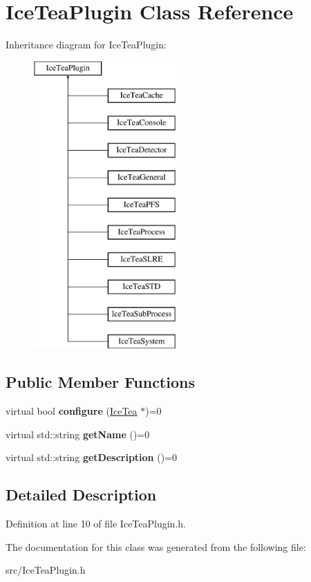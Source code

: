 \hypertarget{class_ice_tea_plugin}{}\section{Ice\+Tea\+Plugin Class Reference}
\label{class_ice_tea_plugin}
Inheritance diagram for Ice\+Tea\+Plugin\+:\begin{figure}[H]
\begin{center}
\leavevmode
\includegraphics[height=11.000000cm]{class_ice_tea_plugin}
\end{center}
\end{figure}
\subsection*{Public Member Functions}
\begin{DoxyCompactItemize}
\item 
virtual bool {\bfseries configure} (\hyperlink{class_ice_tea}{Ice\+Tea} $\ast$)=0\hypertarget{class_ice_tea_plugin_ae532ecb6f435a89f67be46fdd24b9b2a}{}\label{class_ice_tea_plugin_ae532ecb6f435a89f67be46fdd24b9b2a}

\item 
virtual std\+::string {\bfseries get\+Name} ()=0\hypertarget{class_ice_tea_plugin_acff80db4c0063ed72b3e0eba9325b439}{}\label{class_ice_tea_plugin_acff80db4c0063ed72b3e0eba9325b439}

\item 
virtual std\+::string {\bfseries get\+Description} ()=0\hypertarget{class_ice_tea_plugin_aaa6b8ed69a63a55d4412d526a36a0376}{}\label{class_ice_tea_plugin_aaa6b8ed69a63a55d4412d526a36a0376}

\end{DoxyCompactItemize}


\subsection{Detailed Description}


Definition at line 10 of file Ice\+Tea\+Plugin.\+h.



The documentation for this class was generated from the following file\+:\begin{DoxyCompactItemize}
\item 
src/Ice\+Tea\+Plugin.\+h\end{DoxyCompactItemize}
